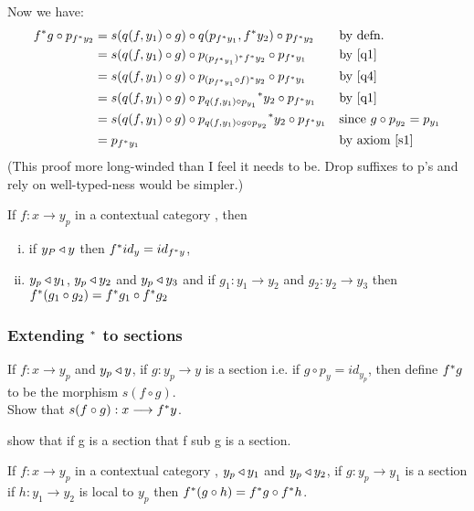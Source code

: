 \documentclass[10pt,a4paper]{scrartcl}
\begin{document}
Now we have:
\begin{align*}
f ^* g \circ p_{f ^* y_2}
    & = s(q(f,y_1) \circ g) \circ q(p_{f ^* y_1},f ^* y_2) \circ p_{f ^* y_2}  &&\mbox{by defn.}\\
    & = s(q(f,y_1) \circ g) \circ p_{(p_{f ^* y_1})^* {f ^* y_2}} \circ p_{f ^* y_1}  &&\mbox{by \ref{q1}}\\
		& = s(q(f,y_1) \circ g) \circ p_{(p_{f ^* y_1} \circ f) ^* y_2} \circ p_{f ^* y_1}  &&\mbox{by \ref{q4}}\\
		& = s(q(f,y_1) \circ g) \circ {p_{q(f,y_1) \circ p_{y_1}}} ^* y_2 \circ p_{f ^* y_1}  &&\mbox{by \ref{q1}}\\
		& = s(q(f,y_1) \circ g) \circ {p_{q(f,y_1) \circ g \circ p_{y_2}}} ^* y_2 \circ p_{f ^* y_1}  &&\mbox{since $g \circ p_{y_2}=p_{y_1}$}\\
		& = p_{f ^* y_1}                             &&\mbox{by axiom \ref{s1}}
\end{align*}
\noindent (This proof more long-winded than I feel it needs to be. Drop suffixes to p's and rely on well-typed-ness would be simpler.)

\begin{lemma} 
\label{fstarfunctorial1}  
If $f:x \rightarrow y_p$ in a contextual category , then
\begin{enumerate} [(i)]
	\item if $y_P \triangleleft y$  then $f ^* id_y = id_{f ^* y}$,
	\item $y_p \triangleleft y_1$, $y_p \triangleleft y_2$ and $y_p \triangleleft y_3$ and if $g_1: y_1 \rightarrow y_2$ and $g_2: y_2 \rightarrow y_3$ then
	$f ^* (g_1 \circ g_2) = f ^* g_1 \circ f ^* g_2$
\end{enumerate}
\end{lemma}

\subsubsection {Extending $^*$ to sections}
If $f:x \longrightarrow y_p$ and $y_p \triangleleft y$, if $g:y_p \longrightarrow y$ is a section i.e. if $g \circ p_y = id_{y_p}$, then
define $f ^* g$ to be the morphism $s(f \circ g)$. \\


\noindent Show that $s(f \circ g) : x \longrightarrow f ^* y$.

\noindent show that if g is a section that f sub g is a section.

\begin{lemma} 
\label{fstarfunctorial2}  
If $f:x \rightarrow y_p$ in a contextual category ,
$y_p \triangleleft y_1$ and $y_p \triangleleft y_2$,
if $g:y_p \longrightarrow y_1$ is a section
 if $h: y_1 \rightarrow y_2$ is local to $y_p$
 then
	$f ^* (g \circ h) = f ^* g \circ f ^* h$.
\end{lemma}
\end{document}
